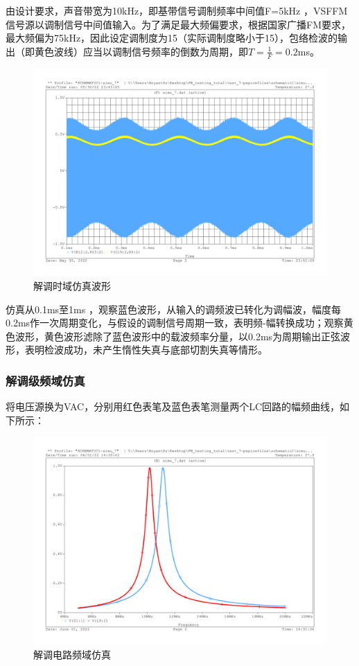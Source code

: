 \documentclass[a4paper,12pt,twoside]{article}
\begin{document}
由设计要求，声音带宽为10kHz，即基带信号调制频率中间值F=5kHz
，VSFFM信号源以调制信号中间值输入。为了满足最大频偏要求，根据国家广播FM要求，最大频偏为75kHz，因此设定调制度为15（实际调制度略小于15），包络检波的输出（即黄色波线）应当以调制信号频率的倒数为周期，即$T=\frac{1}{F}=0.2$ms。
\begin{figure}[H]
    \centering
    \includegraphics[scale=0.35]{解调时域.pdf}
    \caption{解调时域仿真波形}
    \label{解调时域}
\end{figure}
仿真从0.1ms至1ms
，观察蓝色波形，从输入的调频波已转化为调幅波，幅度每0.2ms作一次周期变化，与假设的调制信号周期一致，表明频-幅转换成功；观察黄色波形，黄色波形滤除了蓝色波形中的载波频率分量，以0.2ms为周期输出正弦波形，表明检波成功，未产生惰性失真与底部切割失真等情形。
\subsubsection{解调级频域仿真}
将电压源换为VAC，分别用红色表笔及蓝色表笔测量两个LC回路的幅频曲线，如下所示：
\begin{figure}[H]
    \centering
    \includegraphics[scale=0.32]{解调频域仿真.pdf}
    \caption{解调电路频域仿真}
    \label{解调频域}
\end{figure}
\end{document}
